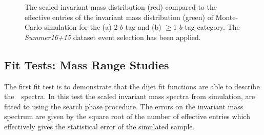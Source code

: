 \begin{figure}[!ht]
  \begin{center}
    \captionsetup[subfigure]{aboveskip=0pt,justification=centering}
  \end{center}
  \caption{The scaled invariant mass distribution (red) compared to the
    effective entries of the invariant mass distribution (green)
    of Monte-Carlo simulation for the (a) 2 $b$-tag and (b) $\geq$1 $b$-tag category.
    The \textit{Summer16+15} dataset event selection has been applied.}
  \label{fig:effEnt}
\end{figure}

\subsection{Fit Tests: Mass Range Studies}
\label{sec:bkg-summer_range}

The first fit test is to demonstrate that
the dijet fit functions are able to describe the~\mjj~spectra.
In this test the scaled invariant mass spectra from simulation,
are fitted to using the search phase procedure.
The errors on the invariant mass spectrum
are given by the square root of the number of effective entries
which effectively gives the statistical error of the simulated sample.

